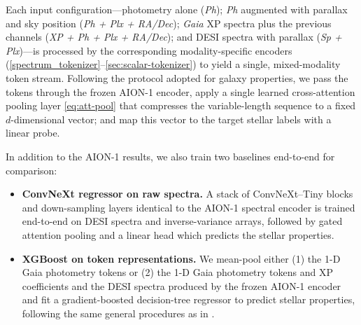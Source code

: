 \documentclass[]{polymathic}
\begin{document}
Each input configuration—photometry alone (\textit{Ph}); \textit{Ph} augmented with parallax and sky position (\textit{Ph + Plx + RA/Dec}); \textit{Gaia} XP spectra plus the previous channels (\textit{XP + Ph + Plx + RA/Dec}); and DESI spectra with parallax (\textit{Sp + Plx})—is processed by the corresponding modality-specific encoders (\autoref{spectrum_tokenizer}–\autoref{sec:scalar-tokenizer}) to yield a single, mixed-modality token stream. Following the protocol adopted for galaxy properties, we pass the tokens through the frozen AION-1 encoder, apply a single learned cross-attention pooling layer \autoref{eq:att-pool} that compresses the variable-length sequence to a fixed $d$-dimensional vector; and map this vector to the target stellar labels with a linear probe. 

In addition to the AION-1 results, we also train two baselines end-to-end for comparison:
\begin{itemize}
    \item \textbf{ConvNeXt regressor on raw spectra.} A stack of ConvNeXt–Tiny blocks and down-sampling layers identical to the AION-1 spectral encoder is trained end-to-end on DESI spectra and inverse-variance arrays, followed by gated attention pooling and a linear head which predicts the stellar properties.
    \item \textbf{XGBoost on token representations.} We mean-pool either (1) the 1-D Gaia photometry tokens or (2) the 1-D Gaia photometry tokens and XP coefficients and the DESI spectra produced by the frozen AION-1 encoder and fit a gradient-boosted decision-tree regressor to predict stellar properties, following the same general procedures as in \cite{Leung2024}.
\end{itemize}
\end{document}
